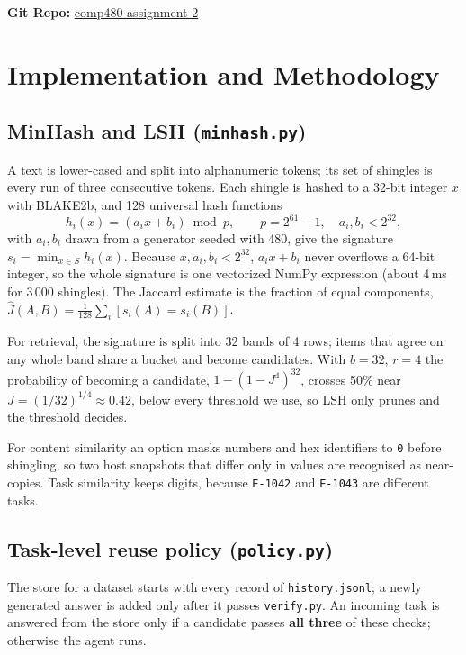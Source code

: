 \documentclass[11pt]{article}
\begin{document}
\textbf{Git Repo:} \href{https://github.com/aidenvierra/comp480-assignment-2}{comp480-assignment-2}

\section{Implementation and Methodology}

\subsection{MinHash and LSH (\texttt{minhash.py})}

A text is lower-cased and split into alphanumeric tokens; its set of shingles is every run of
three consecutive tokens. Each shingle is hashed to a 32-bit integer $x$ with BLAKE2b, and
128 universal hash functions
\[
  h_i(x) = (a_i x + b_i) \bmod p, \qquad p = 2^{61}-1,\quad a_i, b_i < 2^{32},
\]
with $a_i, b_i$ drawn from a generator seeded with 480, give the signature
$s_i = \min_{x \in S} h_i(x)$. Because $x, a_i, b_i < 2^{32}$, $a_i x + b_i$ never overflows
a 64-bit integer, so the whole signature is one vectorized NumPy expression (about 4\,ms for
3\,000 shingles). The Jaccard estimate is the fraction of equal components,
$\hat J(A,B) = \frac{1}{128}\sum_i [s_i(A) = s_i(B)]$.

For retrieval, the signature is split into 32 bands of 4 rows; items that agree on any whole
band share a bucket and become candidates. With $b=32$, $r=4$ the probability of becoming a
candidate, $1-(1-J^4)^{32}$, crosses 50\% near $J = (1/32)^{1/4} \approx 0.42$, below every
threshold we use, so LSH only prunes and the threshold decides.

For content similarity an option masks numbers and hex identifiers to \texttt{0} before
shingling, so two host snapshots that differ only in values are recognised as near-copies.
Task similarity keeps digits, because \texttt{E-1042} and \texttt{E-1043} are different
tasks.

\subsection{Task-level reuse policy (\texttt{policy.py})}

The store for a dataset starts with every record of \texttt{history.jsonl}; a newly generated
answer is added only after it passes \texttt{verify.py}. An incoming task is answered from
the store only if a candidate passes \textbf{all three} of these checks; otherwise the agent
runs.
\end{document}
